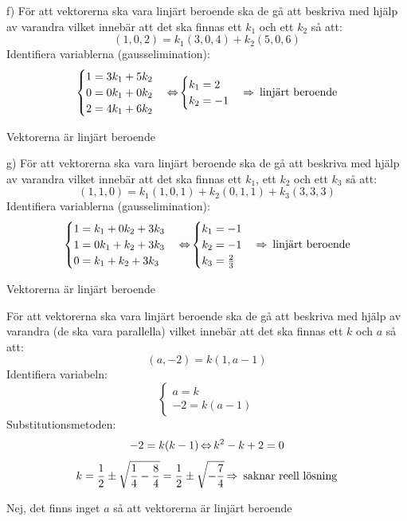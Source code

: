 \begin{task}{f)}
	För att vektorerna ska vara linjärt beroende ska de gå att beskriva med hjälp av varandra vilket innebär att det ska finnas ett $k_1$ och ett $k_2$ så att:
	\[(1,0,2)=k_1(3,0,4)+k_2(5,0,6)\]
	Identifiera variablerna (gausselimination):
	\[\begin{cases}
		1=3k_1+5k_2 \\
		0=0k_1+0k_2 \\
		2=4k_1+6k_2
	\end{cases} \operatorname{\Leftrightarrow}
	\begin{cases}
		k_1=2 \\
		k_2=-1
	\end{cases}\operatorname{\Rightarrow} \text{ linjärt beroende}\]
	
	\ans Vektorerna är linjärt beroende
\end{task}

\begin{task}{g)}
	För att vektorerna ska vara linjärt beroende ska de gå att beskriva med hjälp av varandra vilket innebär att det ska finnas ett $k_1$, ett $k_2$ och ett $k_3$ så att:
	\[(1,1,0)=k_1(1,0,1)+k_2(0,1,1)+k_3(3,3,3)\]
	Identifiera variablerna (gausselimination):
	\[\begin{cases}
		1=k_1+0k_2+3k_3 \\
		1=0k_1+k_2+3k_3 \\
		0=k_1+k_2+3k_3
	\end{cases} \operatorname{\Leftrightarrow}
	\begin{cases}
		k_1=-1 \\
		k_2=-1 \\
		k_3=\frac{2}{3}
	\end{cases}\operatorname{\Rightarrow} \text{ linjärt beroende}\]
	
	\ans Vektorerna är linjärt beroende
\end{task}

\begin{task}{2.21}
	För att vektorerna ska vara linjärt beroende ska de gå att beskriva med hjälp av varandra (de ska vara parallella) vilket innebär att det ska finnas ett $k$ och $a$ så att:
	\[(a,-2)=k(1,a-1)\]
	Identifiera variabeln:
	\[\begin{cases}
		a=k \\
		-2=k(a-1)
	\end{cases}\]
	Substitutionsmetoden:
	\[-2=k(k-1) \operatorname{\Leftrightarrow}
	k^2-k+2=0\]
	\[k=\frac{1}{2}\pm\sqrt{\frac{1}{4}-\frac{8}{4}}=\frac{1}{2}\pm\sqrt{-\frac{7}{4}} \operatorname{\Rightarrow} \text{ saknar reell lösning}\]
	
	\ans Nej, det finns inget $a$ så att vektorerna är linjärt beroende
\end{task}

